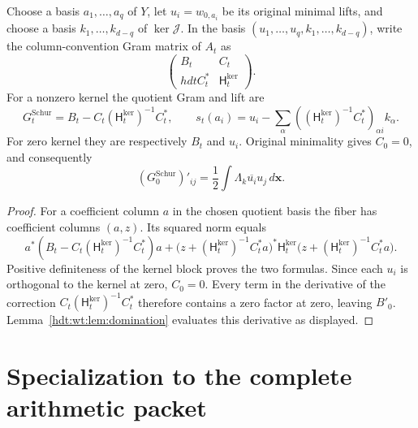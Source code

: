 \documentclass[11pt]{article}
\begin{document}
\begin{hdtproposition}
\label{hdt:wt:prop:Schur}
Choose a basis $a_1,\ldots,a_q$ of $Y$, let $u_i=w_{0,a_i}$
be its original minimal lifts, and choose a basis
$k_1,\ldots,k_{d-q}$ of $\ker\mathcal J$.  In the basis
$(u_1,\ldots,u_q,k_1,\ldots,k_{d-q})$, write the column-convention
Gram matrix of $A_t$ as
\[
 \begin{pmatrix}B_t&C_t\\hdtC_t^*&\mathsf H_t^{\mathrm{ker}}\end{pmatrix}.
\]
For a nonzero kernel the quotient Gram and lift are
\begin{equation}\label{hdt:wt:eq:Schur}
 G_t^{\mathrm{Schur}}=B_t-C_t(\mathsf H_t^{\mathrm{ker}})^{-1}C_t^*,
 \qquad
 s_t(a_i)=u_i-\sum_\alpha
   ((\mathsf H_t^{\mathrm{ker}})^{-1}C_t^*)_{\alpha i}k_\alpha.
\end{equation}
For zero kernel they are respectively $B_t$ and $u_i$.
Original minimality gives $C_0=0$, and consequently
\[
 (G_0^{\mathrm{Schur}})'_{ij}
 =\frac12\int\Lambda_k\overline{u_i}u_j\,d\mathbf x.
\]
\end{hdtproposition}

\begin{proof}
For a coefficient column $a$ in the chosen quotient basis the
fiber has coefficient columns $(a,z)$.  Its squared norm equals
\[
 a^*(B_t-C_t(\mathsf H_t^{\mathrm{ker}})^{-1}C_t^*)a
 +\bigl(z+(\mathsf H_t^{\mathrm{ker}})^{-1}C_t^*a\bigr)^*
 \mathsf H_t^{\mathrm{ker}}
 \bigl(z+(\mathsf H_t^{\mathrm{ker}})^{-1}C_t^*a\bigr).
\]
Positive definiteness of the kernel block proves the two
formulas.  Since each $u_i$ is orthogonal to the kernel at zero,
$C_0=0$.  Every term in the derivative of the correction
$C_t(\mathsf H_t^{\mathrm{ker}})^{-1}C_t^*$ therefore contains a zero
factor at zero, leaving $B'_0$.  Lemma~\ref{hdt:wt:lem:domination}
evaluates this derivative as displayed.
\end{proof}

\section{Specialization to the complete arithmetic packet}
\label{hdt:wt:sec:packet}
\end{document}
